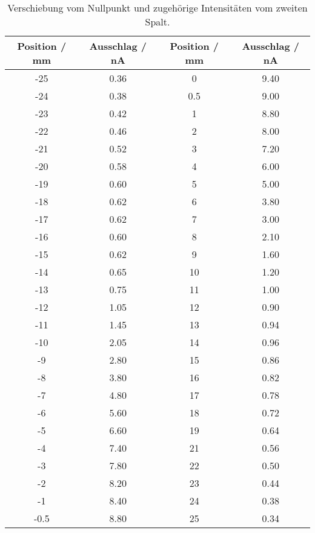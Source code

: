 \begin{table}[!htp]
\centering
\caption{Verschiebung vom Nullpunkt und zugehörige Intensitäten vom zweiten Spalt.}
\label{tab:spalt2}
\begin{tabular}{c c c c}
\toprule
{{Position / mm}} & {{Ausschlag / nA}}  & {{Position / mm}} & {{Ausschlag / nA}}\\
\midrule
-25 & 0.36 &0  & 9.40 \\ 
-24 & 0.38 &0.5& 9.00  \\
-23 & 0.42 & 1 & 8.80  \\
-22 & 0.46 & 2 & 8.00   \\
-21 & 0.52 & 3 & 7.20  \\
-20 & 0.58 & 4 & 6.00  \\
-19 & 0.60 & 5 & 5.00  \\
-18 & 0.62 & 6 & 3.80  \\
-17 & 0.62 & 7 & 3.00  \\
-16 & 0.60 & 8 & 2.10  \\
-15 & 0.62 & 9 & 1.60  \\
-14 & 0.65 &10 & 1.20  \\
-13 & 0.75 &11 & 1.00  \\
-12 & 1.05 &12 & 0.90  \\
-11 & 1.45 &13 & 0.94 \\
-10 & 2.05 &14 & 0.96 \\
-9  & 2.80  &15 & 0.86 \\
-8  & 3.80  &16 & 0.82 \\
-7  & 4.80  &17 & 0.78 \\
-6  & 5.60  &18 & 0.72 \\
-5  & 6.60  &19 & 0.64 \\
-4  & 7.40  &21 & 0.56 \\
-3  & 7.80  &22 & 0.50 \\
-2  & 8.20  &23 & 0.44 \\
-1  & 8.40  &24 & 0.38 \\
-0.5& 8.80  &25 & 0.34 \\
  




\bottomrule
\end{tabular}
\end{table}